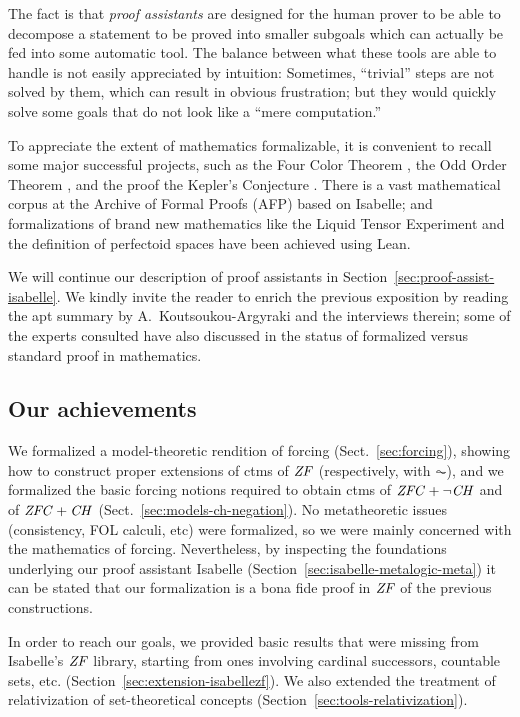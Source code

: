 The fact is that \emph{proof assistants} are designed for the human prover to
be able to decompose a statement to be proved into smaller subgoals
which can actually be fed into some automatic tool. The balance between
what these tools are able to handle is not  easily appreciated by
intuition: Sometimes, ``trivial'' steps are not solved by them, which
can result in obvious frustration; but they would quickly solve some
goals that do not look like a ``mere computation.''

To appreciate the extent of mathematics formalizable, it is convenient to recall
some major successful projects, such as the Four Color Theorem
\cite{MR2463991}, the Odd Order Theorem
\cite{10.1007/978-3-642-39634-2_14}, and the proof the Kepler's
Conjecture \cite{MR3659768}. There is a vast mathematical corpus at
the Archive of Formal Proofs (AFP) based on Isabelle; and formalizations of
brand new mathematics like the Liquid Tensor Experiment
\cite{LTE2020,LTE2021,nature-lte} and the definition of perfectoid spaces \cite{10.1145/3372885.3373830}
have been achieved using Lean.

We will continue our description of proof assistants in
Section~\ref{sec:proof-assist-isabelle}. We kindly invite the reader
to enrich the previous exposition by reading the apt summary by
A.~Koutsoukou-Argyraki \cite{angeliki} and the interviews
therein; some of the experts consulted have also discussed
in \cite{2022arXiv220704779B} the status of formalized versus standard
proof in mathematics.

\subsection{Our achievements}
We formalized a model-theoretic rendition of forcing (Sect.~\ref{sec:forcing}), showing how to
construct proper extensions of ctms of $\mathit{ZF}$ (respectively, with
$\AC$), and we formalized the basic forcing notions required to obtain
ctms of $\mathit{ZFC} + \neg\mathit{CH}$ and of $\mathit{ZFC} + \mathit{CH}$ (Sect.~\ref{sec:models-ch-negation}). No metatheoretic issues
(consistency, FOL calculi, etc) were formalized, so we were mainly
concerned with the mathematics of forcing. Nevertheless, by inspecting
the foundations underlying our proof assistant Isabelle
(Section~\ref{sec:isabelle-metalogic-meta}) it can be stated that our
formalization is a bona fide proof in $\mathit{ZF}$ of the previous
constructions.

In order to reach our goals, we provided basic results that were
missing from Isabelle's $\mathit{ZF}$ library, starting from ones
involving cardinal successors, countable sets, etc.
(Section~\ref{sec:extension-isabellezf}). We also extended the treatment of relativization of
set-theoretical concepts (Section~\ref{sec:tools-relativization}).

